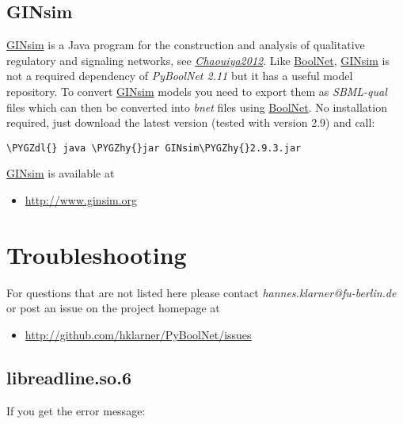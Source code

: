 \documentclass[letterpaper,10pt,english]{sphinxmanual}
\def\PYGZdl{\char`\$}
\def\PYGZhy{\char`\-}
\begin{document}
\subsection{GINsim}
\label{Installation:installation-ginsim}\label{Installation:ginsim}
\href{http://ginsim.org/home}{GINsim} is a Java program for the construction and analysis of qualitative regulatory and signaling networks, see {\hyperref[Bibliography:chaouiya2012]{\emph{Chaouiya2012}}}.
Like \href{https://cran.r-project.org/web/packages/BoolNet/index.html}{BoolNet}, \href{http://ginsim.org/home}{GINsim} is not a required dependency of \emph{PyBoolNet 2.11} but it has a useful model repository. To convert \href{http://ginsim.org/home}{GINsim} models you need to export them as \emph{SBML-qual} files which can then be converted into \emph{bnet} files using \href{https://cran.r-project.org/web/packages/BoolNet/index.html}{BoolNet}.
No installation required, just download the latest version (tested with version 2.9) and call:

\begin{Verbatim}[commandchars=\\\{\}]
\PYGZdl{} java \PYGZhy{}jar GINsim\PYGZhy{}2.9.3.jar
\end{Verbatim}

\href{http://ginsim.org/home}{GINsim} is available at
\begin{itemize}
\item {} 
\href{http://www.ginsim.org}{http://www.ginsim.org}

\end{itemize}


\section{Troubleshooting}
\label{Installation:installation-troubleshooting}\label{Installation:troubleshooting}
For questions that are not listed here please contact \emph{hannes.klarner@fu-berlin.de} or post an issue on the project homepage at
\begin{itemize}
\item {} 
\href{http://github.com/hklarner/PyBoolNet/issues}{http://github.com/hklarner/PyBoolNet/issues}

\end{itemize}


\subsection{libreadline.so.6}
\label{Installation:libreadline-so-6}
If you get the error message:
\end{document}
